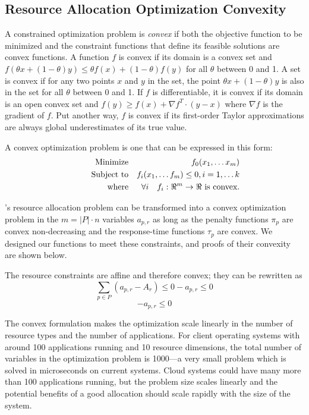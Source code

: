 \subsection{Resource Allocation Optimization Convexity}

A constrained optimization problem is \emph{convex} if both the objective function to be minimized
and the constraint functions that define its feasible solutions are convex functions.
A function $f$ is convex if its domain is a convex set and
$f(\theta x + (1-\theta)y) \leq \theta f(x) + (1-\theta)f(y)$
for all $\theta$ between 0 and 1.
A set is convex if for any two points $x$ and $y$ in the set, the point
$\theta x + (1-\theta)y$
is also in the set for all $\theta$ between 0 and 1.
If $f$ is differentiable, it is convex if its domain is an open convex set and
$f(y) \geq f(x) + \nabla f^T\cdot(y-x)$ where $\nabla f$ is the gradient of $f$.
Put another way, $f$ is convex if its first-order Taylor approximations
are always global underestimates of its true value.

A convex optimization problem is one that can be expressed in this form:
\begin{eqnarray*}
& \makebox[1in][r]{Minimize}   & f_0(x_1,\ldots x_m)                              \\
& \makebox[1in][r]{Subject to} & f_i(x_1,\ldots f_m) \leq 0, i = 1,\ldots k        \\
& \makebox[1in][r]{where}      & \forall i \quad f_i:\Re^m \rightarrow \Re \mbox{ is convex.}
\end{eqnarray*}


\pacora's resource allocation problem can be transformed into a convex
optimization problem in the $m = |P|\cdot n$ variables $a_{p,r}$ as
long as the penalty functions $\pi_p$ are convex non-decreasing and
the response-time functions $\tau_p$ are convex.  We designed our
functions to meet these constraints, and proofs of their convexity are shown below.
 
The resource constraints are affine and therefore convex; they can be rewritten as 
\begin{equation}
\sum_{p\in P} (a_{p,r} - A_r) \leq 0  -a_{p,r} \leq 0
\end{equation}
\begin{equation}
-a_{p,r} \leq 0
\end{equation}

The convex formulation makes the optimization scale linearly in the
number of resource types and the number of applications.  For client
operating systems with around 100 applications running and 10 resource
dimensions, the total number of variables in the optimization problem
is 1000---a very small problem which is solved in microseconds on
current systems.  Cloud systems could have many more than 100
applications running, but the problem size scales linearly and the
potential benefits of a good allocation should scale rapidly with the
size of the system.


